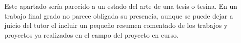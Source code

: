 
Este apartado sería parecido a un estado del arte de una tesis o tesina. En un trabajo final grado no parece obligada su presencia, aunque se puede dejar a juicio del tutor el incluir un pequeño resumen comentado de los trabajos y proyectos ya realizados en el campo del proyecto en curso. 
